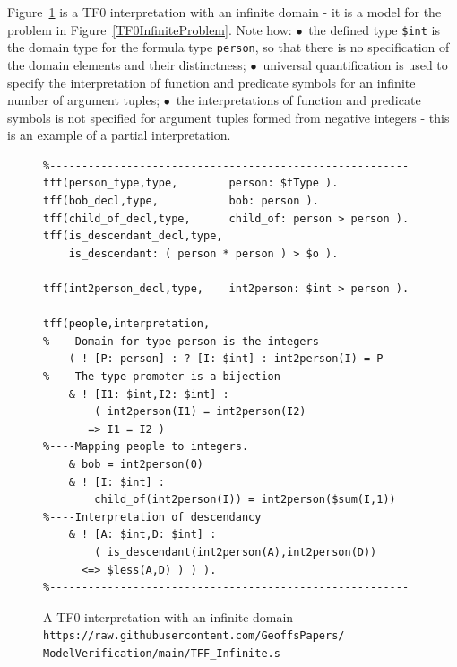 \documentclass[letterpaper]{article}
\newcommand{\smalltt}[1]{\small \texttt{#1}}
\begin{document}
Figure~\ref{TF0InfiniteInterpretation} is a TF0 interpretation with an infinite domain - it 
is a model for the problem in Figure~\ref{TF0InfiniteProblem}.
Note how:
$\bullet$~the defined type \smalltt{\$int} is the domain type for the formula type \smalltt{person},
so that there is no specification of the domain elements and their distinctness;
$\bullet$~universal quantification is used to specify the interpretation of function and predicate
symbols for an infinite number of argument tuples;
$\bullet$~the interpretations of function and predicate symbols is not specified for argument 
tuples formed from negative integers - this is an example of a partial interpretation.

\begin{figure}[tbhp]
\scriptsize
{}
\begin{verbatim}
%--------------------------------------------------------
tff(person_type,type,        person: $tType ).
tff(bob_decl,type,           bob: person ).
tff(child_of_decl,type,      child_of: person > person ).
tff(is_descendant_decl,type, 
    is_descendant: ( person * person ) > $o ).

tff(int2person_decl,type,    int2person: $int > person ).

tff(people,interpretation,
%----Domain for type person is the integers
    ( ! [P: person] : ? [I: $int] : int2person(I) = P
%----The type-promoter is a bijection
    & ! [I1: $int,I2: $int] : 
        ( int2person(I1) = int2person(I2) 
       => I1 = I2 )
%----Mapping people to integers. 
    & bob = int2person(0)
    & ! [I: $int] : 
        child_of(int2person(I)) = int2person($sum(I,1))
%----Interpretation of descendancy
    & ! [A: $int,D: $int] : 
        ( is_descendant(int2person(A),int2person(D)) 
      <=> $less(A,D) ) ) ).
%--------------------------------------------------------
\end{verbatim}
\caption{A TF0 interpretation with an infinite domain\\
{\scriptsize {\tt https://raw.githubusercontent.com/GeoffsPapers/\\
ModelVerification/main/TFF\_Infinite.s}}}
\label{TF0InfiniteInterpretation}
\end{figure}

\end{document}
